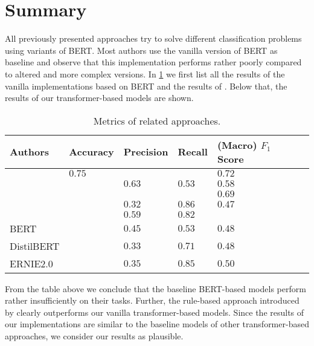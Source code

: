 \section{Summary}
All previously presented approaches try to solve different classification problems using variants of \ac{BERT}.
Most authors use the vanilla version of \ac{BERT} as baseline and observe that this implementation performs rather poorly compared to altered and more complex versions.
In \cref{tab:relation_to_existing_evidence:overview} we first list all the results of the vanilla implementations based on \ac{BERT} and the results of \textcite{Femmer:2017}.
Below that, the results of our transformer-based models are shown.
\pagebreak %
\begin{table}[htpb]
    \centering
    \begin{tabular}{l | l l l l l}
        \toprule
         Authors & Accuracy& Precision & Recall & (Macro) $F_1$ Score  \\
        \midrule
        \Textcite{Xu:2019} & $0.75$ & & & $0.72$  \\
        \Textcite{Martino:2019} && $0.63$ & $0.53$ & $0.58$  \\
        \Textcite{Gao:2019} &&&& $0.69$  \\
        \Textcite{Lee:2019} && $0.32$ & $0.86$ & $0.47$  \\
        \midrule
        \Textcite{Femmer:2017} && $0.59$ &$0.82$ &  \\
        \midrule
        \ac{BERT} & & $0.45$ & $0.53$ & $0.48$ \\
        \ac{DistilBERT} & & $0.33$ & $0.71$ & $0.48$ \\
        \ac{ERNIE2.0} & & $0.35$ & $0.85$ & $0.50$\\
        \bottomrule
    \end{tabular}
    \caption[Metrics of Related Approaches]{Metrics of related approaches.}\label{tab:relation_to_existing_evidence:overview}
\end{table}

From the table above we conclude that the baseline \ac{BERT}-based models perform rather insufficiently on their tasks.
Further, the rule-based approach introduced by \textcite{Femmer:2017} clearly outperforms our vanilla transformer-based models.
Since the results of our implementations are similar to the baseline models of other transformer-based approaches, we consider our results as plausible.
